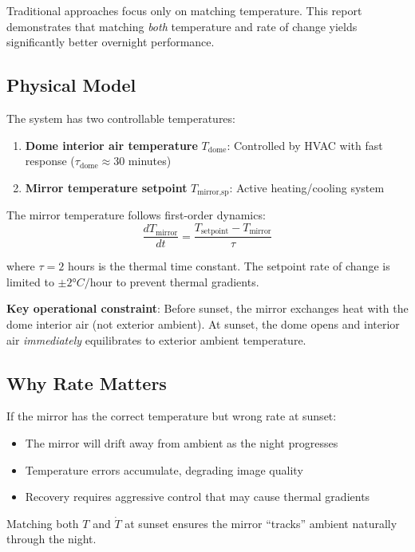 \documentclass[11pt,letterpaper]{article}
\begin{document}
Traditional approaches focus only on matching temperature. This report demonstrates that matching \emph{both} temperature and rate of change yields significantly better overnight performance.

\subsection{Physical Model}

The system has two controllable temperatures:

\begin{enumerate}
    \item \textbf{Dome interior air temperature} $T_\text{dome}$: Controlled by HVAC with fast response ($\tau_\text{dome} \approx 30$ minutes)
    \item \textbf{Mirror temperature setpoint} $T_\text{mirror,sp}$: Active heating/cooling system
\end{enumerate}

The mirror temperature follows first-order dynamics:
\begin{equation}
    \frac{dT_\text{mirror}}{dt} = \frac{T_\text{setpoint} - T_\text{mirror}}{\tau}
    \label{eq:dynamics}
\end{equation}

where $\tau = 2$ hours is the thermal time constant. The setpoint rate of change is limited to $\pm 2°C/\text{hour}$ to prevent thermal gradients.

\textbf{Key operational constraint}: Before sunset, the mirror exchanges heat with the dome interior air (not exterior ambient). At sunset, the dome opens and interior air \emph{immediately} equilibrates to exterior ambient temperature.

\subsection{Why Rate Matters}

If the mirror has the correct temperature but wrong rate at sunset:
\begin{itemize}
    \item The mirror will drift away from ambient as the night progresses
    \item Temperature errors accumulate, degrading image quality
    \item Recovery requires aggressive control that may cause thermal gradients
\end{itemize}

Matching both $T$ and $\dot{T}$ at sunset ensures the mirror ``tracks'' ambient naturally through the night.
\end{document}
